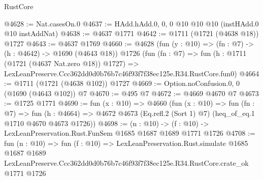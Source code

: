 \begin{lexlean}{RustCore}
\begin{coremodule}
@4628 := Nat.casesOn.{0}
@4637 := HAdd.hAdd.{0, 0, 0} @10 @10 @10 (instHAdd.{0} @10 instAddNat)
@4638 := @4637 @1771
@4642 := @1711 (@1721 (@4638 @18)) @1727
@4643 := @4637 @1769
@4660 := @4628
    (fun (y : @10) => (fn : @7) -> (h : @4642) -> @1690 (@4643 @18))
    @1726
    (fun (fn : @7) =>
    fun (h : @1711 (@1721 (@4637 Nat.zero @18)) @1727) =>
    LexLeanPreserve.Ccc362dd0d0b76b7c46f93f7f38ec125e.R34.RustCore.fun0)
@4664 := @1711 (@1721 (@4638 @102)) @1727
@4669 := Option.noConfusion.{0, 0} (@1690 (@4643 @102)) @7
@4670 := @495 @7
@4672 := @4669 @4670 @7
@4673 := @1725 @1771
@4690 := fun (x : @10) =>
  @4660
    (fun (x : @10) =>
    fun (fn : @7) =>
    fun (h : @4664) =>
    @4672 @4673 (Eq.refl.{2} (Sort 1) @7) (heq_of_eq.{1} @1710 @4670 @4673 @1726))
@4698 := (n : @10) -> (f : @10) -> LexLeanPreservation.Rust.FunSem @1685 @1687 @1689 @1771 @1726
@4708 := fun (n : @10) =>
  fun (f : @10) =>
  LexLeanPreservation.Rust.simulate
    @1685
    @1687
    @1689
    LexLeanPreserve.Ccc362dd0d0b76b7c46f93f7f38ec125e.R34.RustCore.crate_ok
    @1771
    @1726
\end{coremodule}
\end{lexlean}
